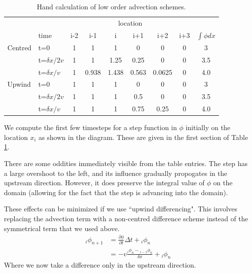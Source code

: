\documentclass[10pt]{article}
\begin{document}
	\begin{table}
		\begin{center}
			\begin{tabular}{l | l | c c c c c c | c}
			\multicolumn{2}{c|}{ }	 & \multicolumn{6}{c|}{location} & \\ 
			& time & i-2 & i-1 & i & i+1 & i+2 & i+3 & $\int \phi dx$ \\ \hline \hline
			Centred & t=0 & 1 & 1 & 1 & 0  & 0 & 0 & 3		\\
				& t=$\delta x/2v$ &  1 & 1 & 1.25 & 0.25  & 0 & 0 & 3.5		\\
				& t=$\delta x/v$ & 1 & 0.938 & 1.438 & 0.563 & 0.0625 & 0 & 4.0 \\ \hline
			Upwind &  t=0 & 1 & 1 & 1 & 0  & 0 & 0 &  3		\\
				& t=$\delta x/2v$ &  1 & 1 & 1 & 0.5  & 0 & 0 & 3.5		\\
				& t=$\delta x/v$ &  1 & 1 & 1 & 0.75  & 0.25 & 0 & 4.0		\\ \hline
			\end{tabular}
		\end{center}
		\caption[]{Hand calculation of low order advection schemes.
		\label{tab:adv1}}
	\end{table}		
		
		
	We compute the first few timesteps for a step function in $\phi$ initially
	on the location $x_i$ as shown in the diagram. These are given  in the first
	section of Table \ref{tab:adv1}. 
	
	There are some oddities immediately visible from the table entries. The step
	has a large overshoot to the left, and its influence gradually propogates in the 
	upstream direction. However, it does preserve the integral value of $\phi$ on
	the domain (allowing for the fact that the step is advancing into the domain).
	
	These effects can be minimized if we use ``upwind differencing". This involves
	replacing the advection term with a non-centred difference scheme instead of
	the symmetrical term that we used above.
		\begin{equation}
			\begin{split}
			_{i}\phi_{n+1} &= \frac{\partial \phi}{\partial t} \Delta t + {_{i}\phi_n} \\
						& = -v \frac{{_{i}\phi_n} - {_{i-1}\phi_n}}{\delta x} + {_{i}\phi_n}
			\end{split}
		\end{equation}
	Where we now take a difference only in the upstream direction. 
	
\end{document}
